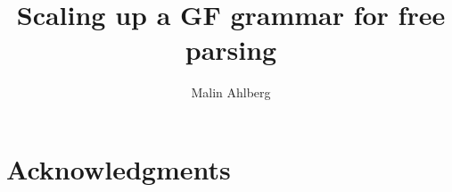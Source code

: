 \documentclass{report}
\begin{document}
\title{Scaling up a GF grammar for free parsing} %
\author{Malin Ahlberg}
\maketitle
\newpage

\tableofcontents
\newpage

\abstract{

}

\newpage

\section*{Acknowledgments}

\newpage
\end{document}

